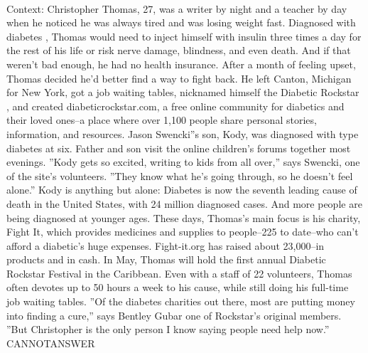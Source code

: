 \documentclass[11pt,a4paper, onecolumn]{article}
\begin{document}
\\ Context: Christopher Thomas, 27, was a writer by night and a teacher by day when he noticed he was always tired and was losing weight fast. Diagnosed with diabetes , Thomas would need to inject himself with insulin three times a day for the rest of his life or risk nerve damage, blindness, and even death. And if that weren't bad enough, he had no health insurance. After a month of feeling upset, Thomas decided he'd better find a way to fight back. He left Canton, Michigan for New York, got a job waiting tables, nicknamed himself the Diabetic Rockstar , and created diabeticrockstar.com, a free online community for diabetics and their loved ones--a place where over 1,100 people share personal stories, information, and resources. Jason Swencki''s son, Kody, was diagnosed with type diabetes at six. Father and son visit the online children's forums together most evenings. ''Kody gets so excited, writing to kids from all over,'' says Swencki, one of the site's volunteers. ''They know what he's going through, so he doesn't feel alone.'' Kody is anything but alone: Diabetes is now the seventh leading cause of death in the United States, with 24 million diagnosed cases. And more people are being diagnosed at younger ages. These days, Thomas's main focus is his charity, Fight It, which provides medicines and supplies to people--225 to date--who can't afford a diabetic's huge expenses. Fight-it.org has raised about  23,000--in products and in cash. In May, Thomas will hold the first annual Diabetic Rockstar Festival in the Caribbean. Even with a staff of 22 volunteers, Thomas often devotes up to 50 hours a week to his cause, while still doing his full-time job waiting tables. ''Of the diabetes charities out there, most are putting money into finding a cure,'' says Bentley Gubar one of Rockstar's original members. ''But Christopher is the only person I know saying people need help now.'' CANNOTANSWER
\end{document}
